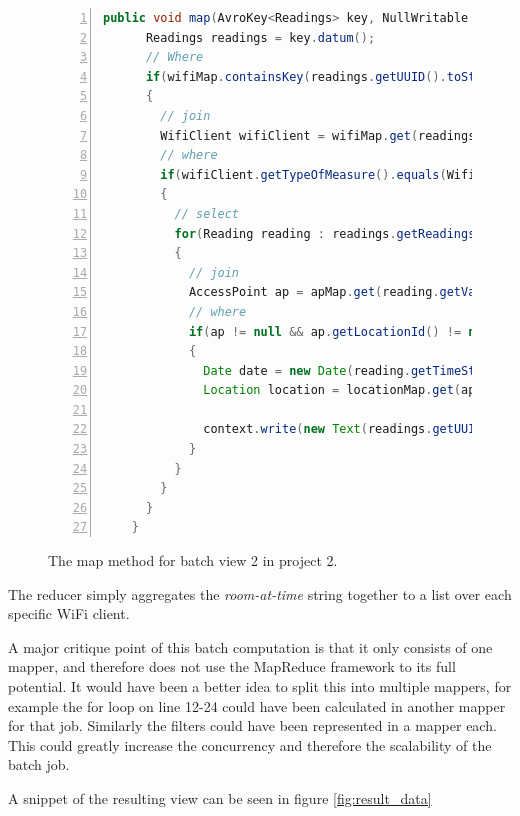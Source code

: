 	\begin{figure}[H]
		
	\begin{lstlisting}[frame=single, backgroundcolor=\color{light-gray}, basicstyle=\footnotesize\ttfamily, language=Java, numbers=left, numberstyle=\tiny \color{black}, breaklines=true]
	public void map(AvroKey<Readings> key, NullWritable value, Context context) throws IOException, InterruptedException {
	  Readings readings = key.datum();
	  // Where
	  if(wifiMap.containsKey(readings.getUUID().toString()))
	  {
		// join
	    WifiClient wifiClient = wifiMap.get(readings.getUUID().toString());
	    // where
	    if(wifiClient.getTypeOfMeasure().equals(WifiClientMeasure.AccessPoint))
	    {
		  // select
	      for(Reading reading : readings.getReadings())
	      {
		    // join
	        AccessPoint ap = apMap.get(reading.getValue());
	        // where
	        if(ap != null && ap.getLocationId() != null && locationMap.containsKey(ap.getLocationId()))
	        {
	          Date date = new Date(reading.getTimeStamp());
	          Location location = locationMap.get(ap.getLocationId());
	           
	          context.write(new Text(readings.getUUID().toString()), new Text(location.getRoom() + "-" + dateFormat.format(date)));
	        }
	      }
	    }
	  }
	}
	\end{lstlisting}
	\caption{The map method for batch view 2 in project 2.}
	\label{code:project2_mapper}
	\end{figure}
	
	The reducer simply aggregates the \textit{room-at-time} string together to a list over each specific WiFi client.
	
	\newpar A major critique point of this batch computation is that it only consists of one mapper, and therefore does not use the MapReduce framework to its full potential. It would have been a better idea to split this into multiple mappers, for example the for loop on line 12-24 could have been calculated in another mapper for that job. Similarly the filters could have been represented in a mapper each. This could greatly increase the concurrency and therefore the scalability of the batch job.
	
	\newpar A snippet of the resulting view can be seen in figure \ref{fig:result_data}
	
